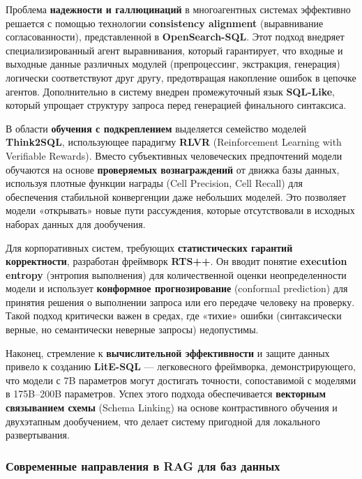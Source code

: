 Проблема \textbf{надежности и галлюцинаций} в многоагентных системах эффективно решается с помощью технологии \textbf{consistency alignment} (выравнивание согласованности), представленной в \textbf{OpenSearch-SQL}. \cite{xie2025opensearch} Этот подход внедряет специализированный агент выравнивания, который гарантирует, что входные и выходные данные различных модулей (препроцессинг, экстракция, генерация) логически соответствуют друг другу, предотвращая накопление ошибок в цепочке агентов. Дополнительно в систему внедрен промежуточный язык \textbf{SQL-Like}, который упрощает структуру запроса перед генерацией финального синтаксиса.

В области \textbf{обучения с подкреплением} выделяется семейство моделей \textbf{Think2SQL}, использующее парадигму \textbf{RLVR} (Reinforcement Learning with Verifiable Rewards). \cite{papicchio2026think2sql} Вместо субъективных человеческих предпочтений модели обучаются на основе \textbf{проверяемых вознаграждений} от движка базы данных, используя плотные функции награды (Cell Precision, Cell Recall) для обеспечения стабильной конвергенции даже небольших моделей. Это позволяет модели «открывать» новые пути рассуждения, которые отсутствовали в исходных наборах данных для дообучения.

Для корпоративных систем, требующих \textbf{статистических гарантий корректности}, разработан фреймворк \textbf{RTS++}. \cite{chen2026rts} Он вводит понятие \textbf{execution entropy} (энтропия выполнения) для количественной оценки неопределенности модели и использует \textbf{конформное прогнозирование} (conformal prediction) для принятия решения о выполнении запроса или его передаче человеку на проверку. Такой подход критически важен в средах, где «тихие» ошибки (синтаксически верные, но семантически неверные запросы) недопустимы.

Наконец, стремление к \textbf{вычислительной эффективности} и защите данных привело к созданию \textbf{LitE-SQL} — легковесного фреймворка, демонстрирующего, что модели с 7B параметров могут достигать точности, сопоставимой с моделями в 175B–200B параметров. \cite{piao2025litesql} Успех этого подхода обеспечивается \textbf{векторным связыванием схемы} (Schema Linking) на основе контрастивного обучения и двухэтапным дообучением, что делает систему пригодной для локального развертывания.

\subsubsection{Современные направления в RAG для баз данных}

